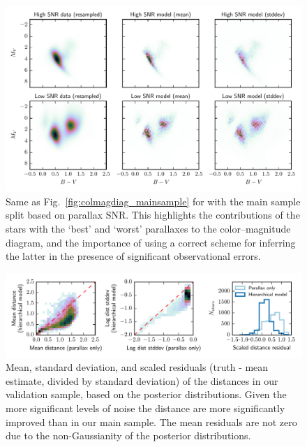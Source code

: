 \documentclass[manuscript, letterpaper]{aastex6}
\newcommand{\figref}[1]{{\xspace}Fig.~\ref{#1}}
\begin{document}
\begin{figure}
\hspace*{-4mm}\includegraphics[width=15.9cm]{colmagdiag_othersamples.pdf}
\caption{Same as \figref{fig:colmagdiag_mainsample} for with the main sample split based on parallax SNR. This highlights the contributions of the stars with the `best' and `worst' parallaxes to the color--magnitude diagram, and the importance of using a correct scheme for inferring the latter in the presence of significant observational errors.}
\label{fig:colmagdiag_othersamples}
\end{figure}

\begin{figure}
\hspace*{-3mm}\includegraphics[width=16cm]{cv_metrics.pdf}
\caption{Mean, standard deviation, and scaled residuals (truth - mean estimate, divided by standard deviation) of the distances in our validation sample, based on the posterior distributions.
Given the more significant levels of noise the distance are more significantly improved than in our main sample. 
The mean residuals are not zero due to the non-Gaussianity of the posterior distributions.}
\label{fig:cv_metrics}
\end{figure}
\end{document}
